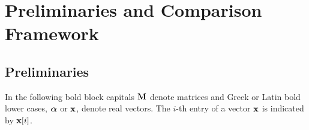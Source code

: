 \section{Preliminaries and Comparison Framework}\label{sec:preliminaries}



\subsection{Preliminaries}
In the following bold block capitals $\textbf{M}$ denote matrices and Greek or Latin bold lower cases, $\boldsymbol\alpha$ or   $\textbf{x}$, denote real vectors. The $i$-th entry of a vector $\textbf{x}$ is indicated by $\textbf{x}[i]$.\\

